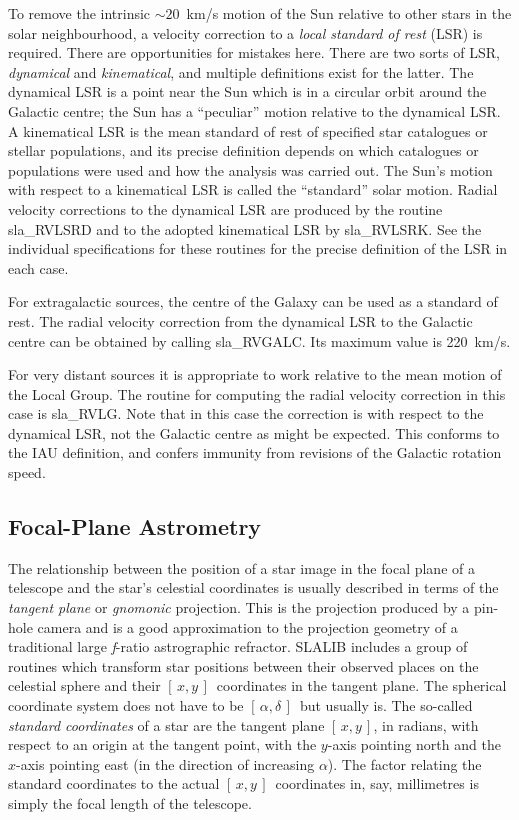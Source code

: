 \documentclass[11pt,twoside]{article}
\newcommand{\radec}     {$[\,\alpha,\delta\,]$}
\newcommand{\xy}        {$[\,x,y\,]$}
\begin{document}
To remove the intrinsic $\sim20$~km/s motion of the Sun relative
to other stars in the solar neighbourhood,
a velocity correction to a
{\it local standard of rest}\/ (LSR) is required.  There are
opportunities for mistakes here.  There are two sorts of LSR,
{\it dynamical}\/ and {\it kinematical}, and
multiple definitions exist for the latter.  The
dynamical LSR is a point near the Sun which is in a circular
orbit around the Galactic centre;  the Sun has a ``peculiar''
motion relative to the dynamical LSR.  A kinematical LSR is
the mean standard of rest of specified star catalogues or stellar
populations, and its precise definition depends on which
catalogues or populations were used and how the analysis was
carried out.  The Sun's motion with respect to a kinematical
LSR is called the ``standard'' solar motion.  Radial
velocity corrections to the dynamical LSR are produced by the routine
sla\_RVLSRD
and to the adopted kinematical LSR by
sla\_RVLSRK.
See the individual specifications for these routines for the
precise definition of the LSR in each case.

For extragalactic sources, the centre of the Galaxy can be used as
a standard of rest.  The radial velocity correction from the
dynamical LSR to the Galactic centre can be obtained by calling
sla\_RVGALC.
Its maximum value is 220~km/s.

For very distant sources it is appropriate to work relative
to the mean motion of the Local Group.  The routine for
computing the radial velocity correction in this case is
sla\_RVLG.
Note that in this case the correction is with respect to the
dynamical LSR, not the Galactic centre as might be expected.
This conforms to the IAU definition, and confers immunity from
revisions of the Galactic rotation speed.

\subsection{Focal-Plane Astrometry}
The relationship between the position of a star image in
the focal plane of a telescope and the star's celestial
coordinates is usually described in terms of the {\it tangent plane}\/
or {\it gnomonic}\/ projection.  This is the projection produced
by a pin-hole camera and is a good approximation to the projection
geometry of a traditional large {\it f}\/-ratio astrographic refractor.
SLALIB includes a group of routines which transform
star positions between their observed places on the celestial
sphere and their \xy\ coordinates in the tangent plane.  The
spherical coordinate system does not have to be \radec\ but
usually is.  The so-called {\it standard coordinates}\/ of a star
are the tangent plane \xy, in radians, with respect to an origin
at the tangent point, with the $y$-axis pointing north and
the $x$-axis pointing east (in the direction of increasing $\alpha$).
The factor relating the standard coordinates to
the actual \xy\ coordinates in, say, millimetres is simply
the focal length of the telescope.
\end{document}
